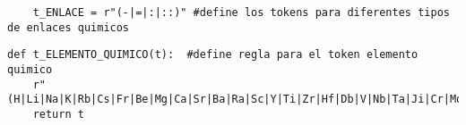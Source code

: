\begin{listing}[H]
\begin{verbatim}
    t_ENLACE = r"(-|=|:|::)" #define los tokens para diferentes tipos de enlaces quimicos
\end{verbatim}
    \caption{Patrón en forma de variable}
    \label{lst: patronVariable}
\end{listing}

\begin{listing}[H]
    \begin{verbatim}
def t_ELEMENTO_QUIMICO(t):  #define regla para el token elemento quimico 
    r"(H|Li|Na|K|Rb|Cs|Fr|Be|Mg|Ca|Sr|Ba|Ra|Sc|Y|Ti|Zr|Hf|Db|V|Nb|Ta|Ji|Cr|Mo|W|Rf|Mn|Tc|Re|Bh|Fe|Ru|Os|Hn|Co|Rh|Ir|Mt|Ni|Pd|Pt|Cu|Ag|Au|Zn|Cd|Hg|B|Al|Ga|In|Ti|C|Si|Ge|Sn|Pb|N|P|As|Sb|Bi|O|S|Se|Te|Po|F|Cr|Br|I|At|He|Ne|Ar|Kr|Xe|Rn)"
    return t
\end{verbatim}
    \caption{Patrón en forma de función}
    \label{lst: patronFuncion}
\end{listing}

